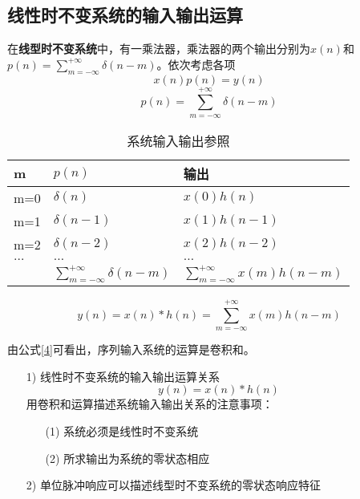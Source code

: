 \documentclass[cn,hazy,blue,14pt,screen,normal]{elegantnote}
\begin{document}
\subsection{线性时不变系统的输入输出运算}
在\textbf{线型时不变系统}中，有一乘法器，乘法器的两个输出分别为$x(n)$和$p(n) = \sum\limits^{+\infty}_{m=-\infty}{\delta(n-m)}$。依次考虑各项
$$x(n)p(n) = y(n)$$
$$p(n) = \sum\limits^{+\infty}_{m=-\infty}{\delta(n-m)}$$
\begin{table}[htbp]
    \centering
    \caption{系统输入输出参照}
    \begin{tabular}{lll}
        \hline
        m   &$p(n)$     &输出\\
        \hline
        m=0 &$\delta(n)$    & $x(0)h(n)$\\
        m=1 &$\delta(n-1)$  & $x(1)h(n-1)$\\
        m=2 &$\delta(n-2)$  & $x(2)h(n-2)$\\
        $\dots$ & $\dots$ &$\dots$ \\
        \hline
            & $\sum\limits^{+\infty}_{m=-\infty}{\delta(n-m)}$ & $\sum\limits^{+\infty}_{m=-\infty}{x(m)h(n-m)}$\\
        \hline
    \end{tabular}
\end{table}

\begin{equation}
    y(n) = x(n)*h(n) = \sum\limits^{+\infty}_{m = -\infty}{x(m)h(n-m)} \label{4}
\end{equation}

由公式\ref{4}可看出，序列输入系统的运算是卷积和。

\begin{itemize}
    \item [1)] 线性时不变系统的输入输出运算关系
            $$y(n) = x(n)*h(n)$$
            用卷积和运算描述系统输入输出关系的注意事项：
            \begin{itemize}
                \item [(1)]系统必须是线性时不变系统
                \item [(2)]所求输出为系统的零状态相应
            \end{itemize}
    \item [2)] 单位脉冲响应可以描述线型时不变系统的零状态响应特征
\end{itemize}
\end{document}
